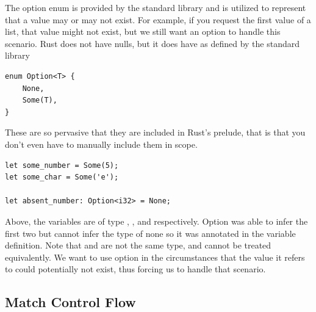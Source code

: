 \documentclass[]{article}
\begin{document}
The option enum is provided by the standard library and is utilized to represent that a value may or may not exist.
For example, if you request the first value of a list, that value might not exist, but we still want an option to handle this scenario.
Rust does not have nulls, but it does have  as defined by the standard library
\begin{verbatim}
enum Option<T> {
	None,
	Some(T),
}
\end{verbatim}
These are so pervasive that they are included in Rust's prelude, that is that you don't even have to manually include them in scope.
\begin{verbatim}
let some_number = Some(5);
let some_char = Some('e');

let absent_number: Option<i32> = None;
\end{verbatim}
Above, the variables are of type , , and  respectively.
Option was able to infer the first two but cannot infer the type of none so it was annotated in the variable definition.
Note that  and  are not the same type, and cannot be treated equivalently.
We want to use option in the circumstances that the value it refers to could potentially not exist, thus forcing us to handle that scenario.
\subsection{Match Control Flow}
\end{document}
